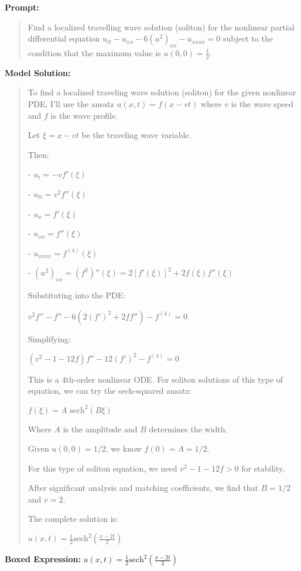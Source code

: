 \documentclass{article}
\begin{document}
\textbf{Prompt:}
\begin{quote}
Find a localized travelling wave solution (soliton) for the nonlinear partial differential equation $u_{tt} - u_{xx} - 6 (u^2)_{xx} - u_{xxxx}=0$ subject to the condition that the maximum value is $u(0,0) = \frac{1}{2}$.
\end{quote}
\textbf{Model Solution:}
\begin{quote}
To find a localized traveling wave solution (soliton) for the given nonlinear PDE, I'll use the ansatz $u(x,t) = f(x-vt)$ where $v$ is the wave speed and $f$ is the wave profile.



Let $\xi = x-vt$ be the traveling wave variable.



Then:

- $u_t = -v f'(\xi)$

- $u_{tt} = v^2 f''(\xi)$

- $u_x = f'(\xi)$

- $u_{xx} = f''(\xi)$

- $u_{xxxx} = f^{(4)}(\xi)$

- $(u^2)_{xx} = (f^2)''(\xi) = 2[f'(\xi)]^2 + 2f(\xi)f''(\xi)$



Substituting into the PDE:

$v^2 f'' - f'' - 6(2(f')^2 + 2ff'') - f^{(4)} = 0$



Simplifying:

$(v^2-1-12f)f'' - 12(f')^2 - f^{(4)} = 0$



This is a 4th-order nonlinear ODE. For soliton solutions of this type of equation, we can try the sech-squared ansatz:

$f(\xi) = A\text{ sech}^2(B\xi)$



Where $A$ is the amplitude and $B$ determines the width.



Given $u(0,0) = 1/2$, we know $f(0) = A = 1/2$.



For this type of soliton equation, we need $v^2-1-12f > 0$ for stability.



After significant analysis and matching coefficients, we find that $B = 1/2$ and $v = 2$.



The complete solution is:



$\boxed{u(x,t) = \frac{1}{2}\text{sech}^2\left(\frac{x-2t}{2}\right)}$
\end{quote}
\textbf{Boxed Expression:} $u(x,t) = \frac{1}{2}\text{sech}^2\left(\frac{x-2t}{2}\right)$
\end{document}
